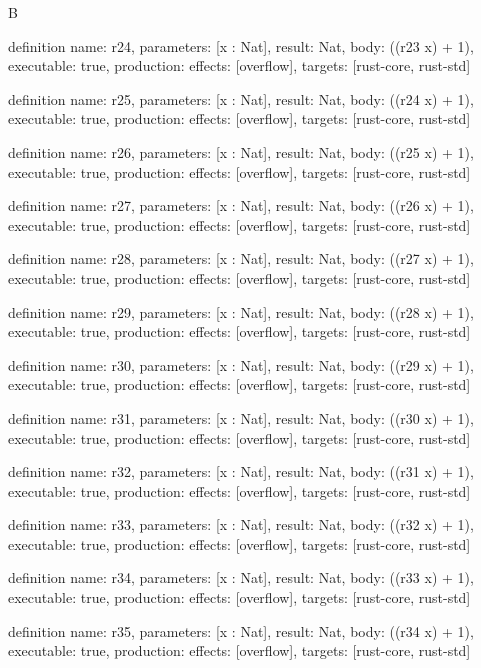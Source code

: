 \begin{lexlean}{B}
\begin{semanticmodule}
definition{
  name: r24,
  parameters: [x : Nat],
  result: Nat,
  body: ((r23 x) + 1),
  executable: true,
  production: {effects: [overflow], targets: [rust-core, rust-std]}
}

definition{
  name: r25,
  parameters: [x : Nat],
  result: Nat,
  body: ((r24 x) + 1),
  executable: true,
  production: {effects: [overflow], targets: [rust-core, rust-std]}
}

definition{
  name: r26,
  parameters: [x : Nat],
  result: Nat,
  body: ((r25 x) + 1),
  executable: true,
  production: {effects: [overflow], targets: [rust-core, rust-std]}
}

definition{
  name: r27,
  parameters: [x : Nat],
  result: Nat,
  body: ((r26 x) + 1),
  executable: true,
  production: {effects: [overflow], targets: [rust-core, rust-std]}
}

definition{
  name: r28,
  parameters: [x : Nat],
  result: Nat,
  body: ((r27 x) + 1),
  executable: true,
  production: {effects: [overflow], targets: [rust-core, rust-std]}
}

definition{
  name: r29,
  parameters: [x : Nat],
  result: Nat,
  body: ((r28 x) + 1),
  executable: true,
  production: {effects: [overflow], targets: [rust-core, rust-std]}
}

definition{
  name: r30,
  parameters: [x : Nat],
  result: Nat,
  body: ((r29 x) + 1),
  executable: true,
  production: {effects: [overflow], targets: [rust-core, rust-std]}
}

definition{
  name: r31,
  parameters: [x : Nat],
  result: Nat,
  body: ((r30 x) + 1),
  executable: true,
  production: {effects: [overflow], targets: [rust-core, rust-std]}
}

definition{
  name: r32,
  parameters: [x : Nat],
  result: Nat,
  body: ((r31 x) + 1),
  executable: true,
  production: {effects: [overflow], targets: [rust-core, rust-std]}
}

definition{
  name: r33,
  parameters: [x : Nat],
  result: Nat,
  body: ((r32 x) + 1),
  executable: true,
  production: {effects: [overflow], targets: [rust-core, rust-std]}
}

definition{
  name: r34,
  parameters: [x : Nat],
  result: Nat,
  body: ((r33 x) + 1),
  executable: true,
  production: {effects: [overflow], targets: [rust-core, rust-std]}
}

definition{
  name: r35,
  parameters: [x : Nat],
  result: Nat,
  body: ((r34 x) + 1),
  executable: true,
  production: {effects: [overflow], targets: [rust-core, rust-std]}
}


\end{semanticmodule}
\end{lexlean}

